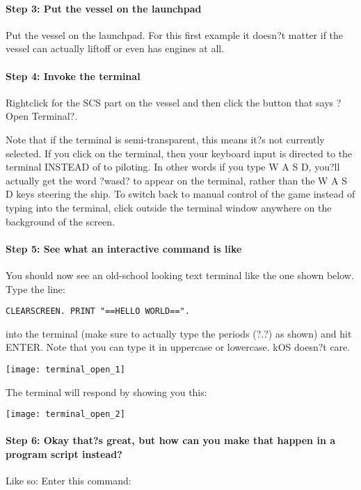 \paragraph{Step 3: Put the vessel on the launchpad}
Put the vessel on the launchpad. For this first example it doesn?t matter if the vessel can actually liftoff or even has engines at all.

\paragraph{Step 4: Invoke the terminal}
Rightclick for the SCS part on the vessel and then click the button that says ?Open Terminal?.

Note that if the terminal is semi-transparent, this means it?s not currently selected. If you click on the terminal, then your keyboard input is directed to the terminal INSTEAD of to piloting. In other words if you type W A S D, you?ll actually get the word ?wasd? to appear on the terminal, rather than the W A S D keys steering the ship. To switch back to manual control of the game instead of typing into the terminal, click outside the terminal window anywhere on the background of the screen.

\paragraph{Step 5: See what an interactive command is like}
You should now see an old-school looking text terminal like the one shown below. Type the line:

\begin{Verbatim}[frame=single]
CLEARSCREEN. PRINT "==HELLO WORLD==".
\end{Verbatim} 

into the terminal (make sure to actually type the periods (?.?) as shown) and hit ENTER. Note that you can type it in uppercase or lowercase. kOS doesn?t care.

\begin{center}
\texttt{[image: terminal\_open\_1]}
\end{center}

The terminal will respond by showing you this:

\begin{center}
\texttt{[image: terminal\_open\_2]}
\end{center}

\paragraph{Step 6: Okay that?s great, but how can you make that happen in a program script instead?}
Like so: Enter this command:

